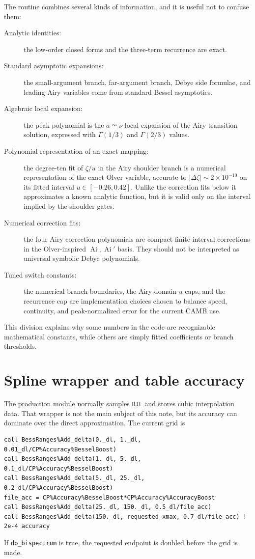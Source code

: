 \documentclass[11pt,a4paper]{article}
\newcommand{\Ai}{\operatorname{Ai}}
\newcommand{\code}[1]{\texttt{#1}}
\newcommand{\D}{\Delta}
\begin{document}
The routine combines several kinds of information, and it is useful not to confuse them:
\begin{description}
\item[Analytic identities:] the low-order closed forms and the three-term recurrence are exact.
\item[Standard asymptotic expansions:] the small-argument branch, far-argument branch, Debye side formulae, and leading Airy variables come from standard Bessel asymptotics.
\item[Algebraic local expansion:] the peak polynomial is the $a\simeq\nu$ local expansion of the Airy transition solution, expressed with $\Gamma(1/3)$ and $\Gamma(2/3)$ values.
\item[Polynomial representation of an exact mapping:] the degree-ten fit of $\zeta/u$ in the Airy shoulder branch is a numerical representation of the exact Olver variable, accurate to $|\D\zeta|\sim2\times10^{-10}$ on its fitted interval $u\in[-0.26,0.42]$.  Unlike the correction fits below it approximates a known analytic function, but it is valid only on the interval implied by the shoulder gates.
\item[Numerical correction fits:] the four Airy correction polynomials are compact finite-interval corrections in the Olver-inspired $\Ai,\Ai'$ basis.  They should not be interpreted as universal symbolic Debye polynomials.
\item[Tuned switch constants:] the numerical branch boundaries, the Airy-domain $u$ caps, and the recurrence cap are implementation choices chosen to balance speed, continuity, and peak-normalized error for the current CAMB use.
\end{description}

This division explains why some numbers in the code are recognizable mathematical constants, while others are simply fitted coefficients or branch thresholds.

\section{Spline wrapper and table accuracy}

The production module normally samples \code{BJL} and stores cubic interpolation data.  That wrapper is not the main subject of this note, but its accuracy can dominate over the direct approximation.  The current grid is
\begin{lstlisting}[style=fortran]
call BessRanges%Add_delta(0._dl, 1._dl, 0.01_dl/CP%Accuracy%BesselBoost)
call BessRanges%Add_delta(1._dl, 5._dl, 0.1_dl/CP%Accuracy%BesselBoost)
call BessRanges%Add_delta(5._dl, 25._dl, 0.2_dl/CP%Accuracy%BesselBoost)
file_acc = CP%Accuracy%BesselBoost*CP%Accuracy%AccuracyBoost
call BessRanges%Add_delta(25._dl, 150._dl, 0.5_dl/file_acc)
call BessRanges%Add_delta(150._dl, requested_xmax, 0.7_dl/file_acc) ! 2e-4 accuracy
\end{lstlisting}
If \code{do\_bispectrum} is true, the requested endpoint is doubled before the grid is made.
\end{document}

